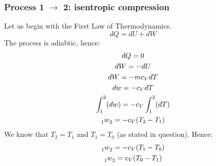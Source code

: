 \documentclass[12pt]{article}
\numberwithin{equation}{section}
\begin{document}
\begin{flushleft}
\subsubsection*{Process 1 $\rightarrow$ 2: isentropic compression}
Let us begin with the First Law of Thermodynamics.
\begin{equation}
  dQ = dU + dW
\end{equation}
The process is adiabtic, hence:
\begin{gather}
  dQ = 0\\
  dW = - dU\\
  dW = -m c_V dT\\
  dw = - c_V dT\\
  \int_1^2(dw) = -c_V \int_1^2(dT)\\
  \tensor[_1]{w}{_2} = -c_V (T_2 - T_1)\\
\end{gather}
We know that $T_2 = T_1$ and $T_1 = T_0$ (as stated in question). Hence:
\begin{gather}
  \tensor[_1]{w}{_2} = -c_V (T_1 - T_0)\\
  \tensor[_1]{w}{_2} = c_V (T_0 - T_1)
\end{gather}


\end{flushleft}
\end{document}

